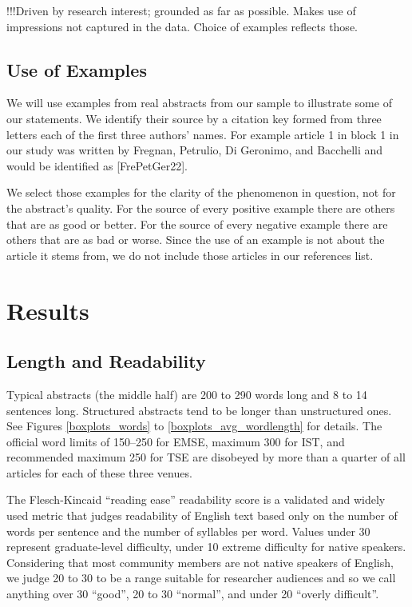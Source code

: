 \documentclass[10pt,journal,compsoc]{IEEEtran}
\newcommand{\ifarxiv}[1]{#1}  %
\begin{document}
!!!Driven by research interest; grounded as far as possible.
Makes use of impressions not captured in the data.
Choice of examples reflects those.


\subsection{Use of Examples}

We will use examples from real abstracts from our sample to illustrate
some of our statements. 
We identify their source by a citation key
formed from three letters each of the first three authors' names.
For example article 1 in block 1 in our study was written by
Fregnan, Petrulio, Di Geronimo, and Bacchelli
and would be identified as [FrePetGer22].

We select those examples for the clarity of the phenomenon in question,
not for the abstract's quality.
For the source of every positive example there are others that are
as good or better.
For the source of every negative example there are others that are
as bad or worse.
Since the use of an example is not about the article it stems from,
we do not include those articles in our references list.

\section{Results}

\subsection{Length and Readability}

Typical abstracts (the middle half) are 200 to 290 words long
and 8 to 14 sentences long.
Structured abstracts tend to be longer than unstructured ones.
\ifarxiv{See Figures \ref{boxplots_words} to \ref{boxplots_avg_wordlength} for details.}
The official word limits of 
150--250 for EMSE,
maximum 300 for IST, and
recommended maximum 250 for TSE
are disobeyed by more than a quarter of all articles for each of these three venues.

The Flesch-Kincaid ``reading ease'' readability score \cite{KinFisRog75}
is a validated and widely used metric that judges readability of English text
based only on the number of words per sentence and the number of 
syllables per word. 
Values under 30 represent graduate-level difficulty,
under 10 extreme difficulty for native speakers.
Considering that most community members are not native speakers of English,
we judge 20 to 30 to be a range suitable for researcher audiences and so 
we call anything over 30 ``good'', 
20 to 30 ``normal'', and 
under 20 ``overly difficult''.
\end{document}

